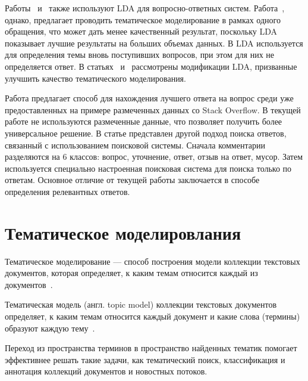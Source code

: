Работы~\cite{LDA1} и~\cite{LDA2} также используют LDA для вопросно-ответных систем. Работа~\cite{LDA1}, однако, предлагает проводить тематическое моделирование в рамках одного обращения, что может дать менее качественный результат, поскольку LDA показывает лучшие результаты на больших объемах данных. В \cite{LDA2} LDA используется для определения темы вновь поступивших вопросов, при этом для них не определяется ответ. В статьях~\cite{TMuse} и~\cite{2016lda} рассмотрены модификации LDA, призванные улучшить качество тематического моделирования.

Работа \cite{so} предлагает способ для нахождения лучшего ответа  на вопрос среди уже предоставленных на примере размеченных данных со Stack Overflow. В текущей работе не используются размеченные данные, что позволяет получить более универсальное решение. В статье \cite{engine} представлен другой подход поиска ответов, связанный с использованием поисковой системы. Сначала комментарии разделяются на 6 классов: вопрос, уточнение, ответ, отзыв на ответ, мусор. Затем используется специально настроенная поисковая система для поиска только по ответам. Основное отличие от текущей работы заключается в способе определения релевантных ответов.

\section{Тематическое моделировлания}
\label{sec:overview_tm}

Тематическое моделирование — способ построения модели коллекции текстовых документов, которая определяет, к каким темам относится каждый из документов~\cite{TM}. 

Тематическая модель (англ. topic model) коллекции текстовых документов определяет, к каким темам относится каждый документ и какие слова (термины) образуют каждую тему~\cite{ML_PTM}. 

Переход из пространства терминов в пространство найденных тематик помогает эффективнее решать такие задачи, как тематический поиск, классификация и аннотация коллекций документов и новостных потоков.

